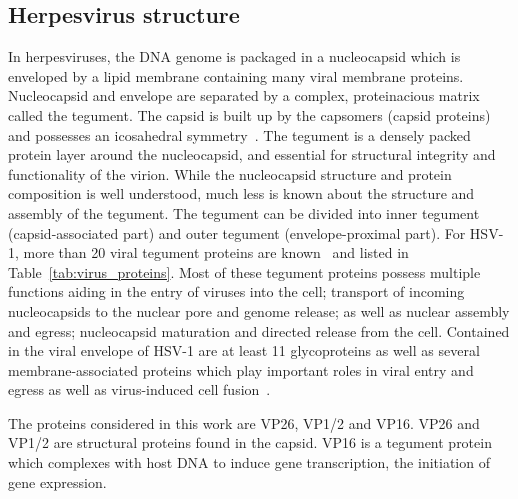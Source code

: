 \pagebreak

\subsection{Herpesvirus structure}
In herpesviruses, the DNA genome is packaged in a nucleocapsid which is enveloped by a lipid membrane containing many viral membrane proteins.
Nucleocapsid and envelope are separated by a complex, proteinacious matrix called the tegument.
The \gls{capsid} is built up by the capsomers (capsid proteins) and possesses an icosahedral symmetry~\cite{[4]}.
The tegument is a densely packed protein layer around the nucleocapsid, and essential for structural integrity and functionality of the virion.
While the nucleocapsid structure and protein composition is well understood, much less is known about the structure and assembly of the tegument.
The tegument can be divided into inner tegument (capsid-associated part) and outer tegument (envelope-proximal part).
For HSV-1, more than 20 viral tegument proteins are known~\cite{[5, 6]} and listed in Table~\ref{tab:virus_proteins}.
Most of these tegument proteins possess multiple functions aiding in the entry of viruses into the cell; transport of incoming nucleocapsids to the nuclear pore and genome release; as well as nuclear assembly and egress; nucleocapsid maturation and directed release from the cell.
Contained in the viral envelope of HSV-1 are at least 11 glycoproteins as well as several membrane-associated proteins which play important roles in viral entry and egress as well as virus-induced cell fusion~\cite{[2, 7]}.

The proteins considered in this work are \gls{VP26}, \gls{VP1/2} and \gls{VP16}.
\gls{VP26}\cite{tangCrystalStructuresMajor2007} and \gls{VP1/2} are structural proteins found in the capsid.
\gls{VP16} is a tegument protein which complexes with host DNA to induce gene transcription, the initiation of gene expression.

